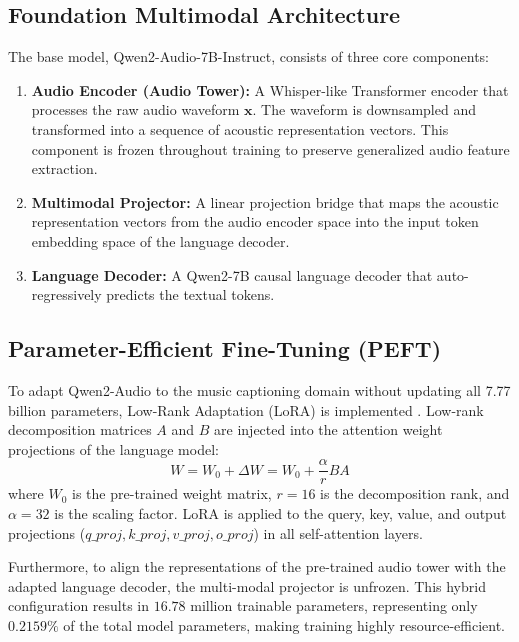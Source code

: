 \documentclass[12pt, conference, letterpaper]{IEEEtran}
\begin{document}
\subsection{Foundation Multimodal Architecture}
The base model, Qwen2-Audio-7B-Instruct, consists of three core components:
\begin{enumerate}
    \item \textbf{Audio Encoder (Audio Tower):} A Whisper-like Transformer encoder that processes the raw audio waveform $\mathbf{x}$. The waveform is downsampled and transformed into a sequence of acoustic representation vectors. This component is frozen throughout training to preserve generalized audio feature extraction.
    \item \textbf{Multimodal Projector:} A linear projection bridge that maps the acoustic representation vectors from the audio encoder space into the input token embedding space of the language decoder.
    \item \textbf{Language Decoder:} A Qwen2-7B causal language decoder that auto-regressively predicts the textual tokens.
\end{enumerate}

\subsection{Parameter-Efficient Fine-Tuning (PEFT)}
To adapt Qwen2-Audio to the music captioning domain without updating all 7.77 billion parameters, Low-Rank Adaptation (LoRA) is implemented \cite{LoRA}. Low-rank decomposition matrices $A$ and $B$ are injected into the attention weight projections of the language model:
\begin{equation}
    W = W_0 + \Delta W = W_0 + \frac{\alpha}{r} B A
\end{equation}
where $W_0$ is the pre-trained weight matrix, $r=16$ is the decomposition rank, and $\alpha=32$ is the scaling factor. LoRA is applied to the query, key, value, and output projections ($q\_proj, k\_proj, v\_proj, o\_proj$) in all self-attention layers.

Furthermore, to align the representations of the pre-trained audio tower with the adapted language decoder, the multi-modal projector is unfrozen. This hybrid configuration results in $16.78$ million trainable parameters, representing only $0.2159\%$ of the total model parameters, making training highly resource-efficient.
\end{document}
